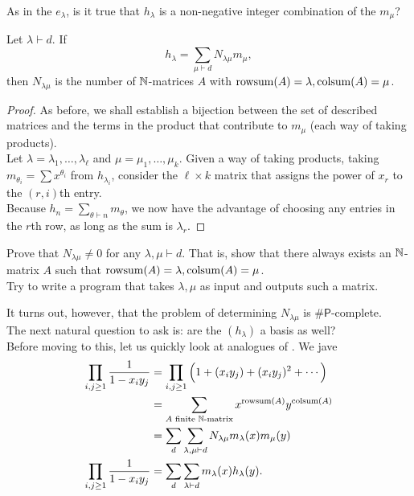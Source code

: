 	As in the $e_\lambda$, is it true that $h_\lambda$ is a non-negative integer combination of the $m_\mu$?
	\begin{flem}
		Let $\lambda \vdash d$. If
		\[ h_\lambda = \sum_{\mu \vdash d} N_{\lambda\mu} m_\mu, \]
		then $N_{\lambda\mu}$ is the number of $\mathbb{N}$-matrices $A$ with $\operatorname{rowsum}(A) = \lambda, \operatorname{colsum}(A) = \mu$.
	\end{flem}
	\begin{proof}
		As before, we shall establish a bijection between the set of described matrices and the terms in the product that contribute to $m_\mu$ (each way of taking products).\\
		Let $\lambda = \lambda_1,\ldots,\lambda_\ell$ and $\mu = \mu_1,\ldots,\mu_k$. Given a way of taking products, taking $m_{\theta_i} = \sum x^{\theta_i}$ from $h_{\lambda_i}$, consider the $\ell \times k$ matrix that assigns the power of $x_r$ to the $(r,i)$th entry.\\ 
		Because $h_n = \sum_{\theta \vdash n} m_\theta$, we now have the advantage of choosing any entries in the $r$th row, as long as the sum is $\lambda_r$.
	\end{proof}


	\begin{exercise}
		Prove that $N_{\lambda\mu} \ne 0$ for any $\lambda,\mu \vdash d$. That is, show that there always exists an $\mathbb{N}$-matrix $A$ such that $\operatorname{rowsum}(A) = \lambda,\operatorname{colsum}(A) = \mu$.\\
		Try to write a program that takes $\lambda,\mu$ as input and outputs such a matrix.
	\end{exercise}

	It turns out, however, that the problem of determining $N_{\lambda\mu}$ is $\#\mathsf{P}$-complete.\\ %
	The next natural question to ask is: are the $(h_\lambda)$ a basis as well?\\
	Before moving to this, let us quickly look at analogues of . We jave
	\begin{align}
		\prod_{i,j \ge 1} \frac{1}{1-x_iy_j} &= \prod_{i,j \ge 1} \left(1 + (x_iy_j) + (x_iy_j)^2 + \cdots\right) \nonumber \\
			&= \sum_{\text{$A$ finite $\mathbb{N}$-matrix}} x^{\operatorname{rowsum}(A)} y^{\operatorname{colsum}(A)} \nonumber \\
			&= \sum_d \sum_{\lambda,\mu \vdash d} N_{\lambda\mu} m_\lambda(x) m_\mu(y) \nonumber \\
		\prod_{i,j \ge 1} \frac{1}{1-x_iy_j} &= \sum_d \sum_{\lambda \vdash d} m_\lambda(x) h_\lambda(y). \label{eqn: prod 1 m xi yj}
	\end{align}

